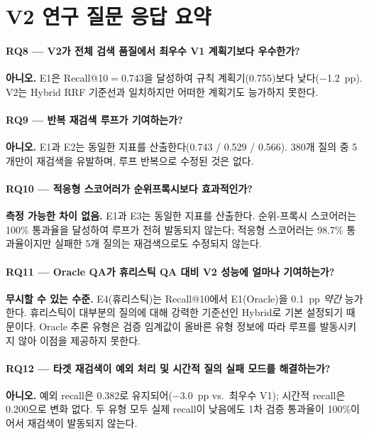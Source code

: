 
\section{V2 연구 질문 응답 요약}
\label{sec:v2_rq_summary_ko}

\paragraph{RQ8 --- V2가 전체 검색 품질에서 최우수 V1 계획기보다 우수한가?} \textbf{아니오.} E1은 Recall@10$={0.743}$을 달성하여 규칙 계획기(0.755)보다 낮다($-$1.2~pp). V2는 Hybrid RRF 기준선과 일치하지만 어떠한 계획기도 능가하지 못한다.

\paragraph{RQ9 --- 반복 재검색 루프가 기여하는가?} \textbf{아니오.} E1과 E2는 동일한 지표를 산출한다(0.743 / 0.529 / 0.566). 380개 질의 중 5개만이 재검색을 유발하며, 루프 반복으로 수정된 것은 없다.

\paragraph{RQ10 --- 적응형 스코어러가 순위프록시보다 효과적인가?} \textbf{측정 가능한 차이 없음.} E1과 E3는 동일한 지표를 산출한다. 순위-프록시 스코어러는 100\% 통과율을 달성하여 루프가 전혀 발동되지 않는다; 적응형 스코어러는 98.7\% 통과율이지만 실패한 5개 질의는 재검색으로도 수정되지 않는다.

\paragraph{RQ11 --- Oracle QA가 휴리스틱 QA 대비 V2 성능에 얼마나 기여하는가?} \textbf{무시할 수 있는 수준.} E4(휴리스틱)는 Recall@10에서 E1(Oracle)을 0.1~pp \emph{약간} 능가한다. 휴리스틱이 대부분의 질의에 대해 강력한 기준선인 Hybrid로 기본 설정되기 때문이다. Oracle 추론 유형은 검증 임계값이 올바른 유형 정보에 따라 루프를 발동시키지 않아 이점을 제공하지 못한다.

\paragraph{RQ12 --- 타겟 재검색이 예외 처리 및 시간적 질의 실패 모드를 해결하는가?} \textbf{아니오.} 예외 recall은 0.382로 유지되어($-$3.0~pp vs.\ 최우수 V1); 시간적 recall은 0.200으로 변화 없다. 두 유형 모두 실제 recall이 낮음에도 1차 검증 통과율이 100\%이어서 재검색이 발동되지 않는다.

